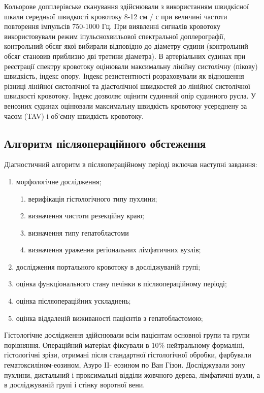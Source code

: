 Кольорове допплерівське сканування здійснювали з використанням швидкісної шкали середньої швидкості кровотоку 8-12 см / с при величині частоти повторення імпульсів 750-1000 Гц. При виявленні сигналів кровотоку використовували режим іпульснохвильової спектральної доплерографії, контрольний обсяг якої вибирали відповідно до діаметру судини (контрольний обсяг становив приблизно дві третини діаметра). В артеріальних судинах при реєстрації спектру кровотоку оцінювали максимальну лінійну систолічну (пікову) швидкість, індекс опору. Індекс резистентності розраховували як відношення різниці лінійної систолічної та діастолічної швидкостей до лінійної систолічної швидкості кровотоку. Індекс дозволяє оцінити судинний опір судинного русла. У венозних судинах оцінювали максимальну швидкість кровотоку усереднену за часом (TAV) і об'ємну швидкість кровотоку.

\subsection{Алгоритм післяопераційного обстеження}

Діагностичний алгоритм в післяопераційному періоді включав наступні завдання:

\begin{enumerate}
    \item морфологічне дослідження;
    \begin{enumerate}
    \item верифікація гістологічного типу пухлини;
    \item визначення чистоти резекційну краю;
    \item визначення типу гепатобластоми
    \item визначення ураження регіональних лімфатичних вузлів;
\end{enumerate}
    \item дослідження портального кровотоку в досліджуваній групі;
    \item оцінка функціонального стану печінки в післяопераційному періоді;
    \item оцінка післяопераційних ускладнень;
    \item оцінка віддаленій виживаності пацієнтів з гепатобластомою;
\end{enumerate}






Гістологічне дослідження здійснювали всім пацієнтам основної групи та групи порівняння. Операційний матеріал фіксували в 10\% нейтральному формаліні, гістологічні зрізи, отримані після стандартної гістологічної обробки, фарбували гематоксиліном-еозином, Азуро II- еозином по Ван Гізон. Досліджували зону пухлини, дистальний і проксимальні відділи жовчного дерева, лімфатичні вузли, а в досліджуваній групі і стінку воротної вени.



